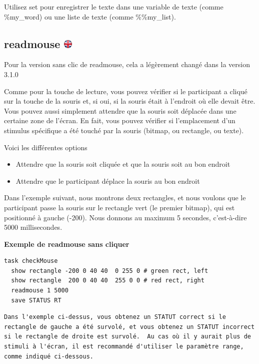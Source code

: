\documentclass[
]{book}
\providecommand{\tightlist}{%
  \setlength{\itemsep}{0pt}\setlength{\parskip}{0pt}}
\begin{document}
Utilisez set pour enregistrer le texte dans une variable de texte (comme \%my\_word) ou une liste de texte (comme \%\%my\_list).

\hypertarget{readmouse}{%
\subsection[readmouse ]{\texorpdfstring{readmouse \href{https://www.psytoolkit.org/doc3.4.0/syntax.html\#task-readmouse}{\protect\includegraphics{img/ukflag.png}}}{readmouse }}\label{readmouse}}

Pour la version sans clic de readmouse, cela a légèrement changé dans la version 3.1.0

Comme pour la touche de lecture, vous pouvez vérifier si le participant a cliqué sur la touche de la souris et, si oui, si la souris était à l'endroit où elle devait être. Vous pouvez aussi simplement attendre que la souris soit déplacée dans une certaine zone de l'écran. En fait, vous pouvez vérifier si l'emplacement d'un stimulus spécifique a été touché par la souris (bitmap, ou rectangle, ou texte).

Voici les différentes options

\begin{itemize}
\tightlist
\item
  Attendre que la souris soit cliquée et que la souris soit au bon endroit
\item
  Attendre que le participant déplace la souris au bon endroit
\end{itemize}

Dans l'exemple suivant, nous montrons deux rectangles, et nous voulons que le participant passe la souris sur le rectangle vert (le premier bitmap), qui est positionné à gauche (-200). Nous donnons au maximum 5 secondes, c'est-à-dire 5000 millisecondes.

\textbf{Exemple de readmouse sans cliquer}

\begin{verbatim}
task checkMouse
  show rectangle -200 0 40 40  0 255 0 # green rect, left
  show rectangle  200 0 40 40  255 0 0 # red rect, right
  readmouse 1 5000
  save STATUS RT
\end{verbatim}

\begin{verbatim}
Dans l'exemple ci-dessus, vous obtenez un STATUT correct si le rectangle de gauche a été survolé, et vous obtenez un STATUT incorrect si le rectangle de droite est survolé.  Au cas où il y aurait plus de stimuli à l'écran, il est recommandé d'utiliser le paramètre range, comme indiqué ci-dessous.
\end{verbatim}
\end{document}
